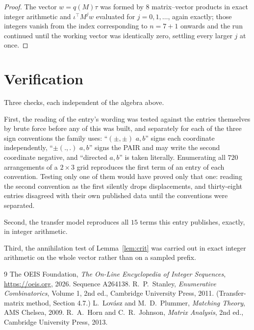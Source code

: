 \documentclass[11pt,a4paper]{article}
\theoremstyle{plain}
\theoremstyle{definition}
\begin{document}
\begin{proof}
The vector $w=q(M)\tau$ was formed by $8$ matrix--vector products in exact integer
arithmetic and $\iota^{\!\top}M^{j}w$ evaluated for $j=0,1,\dots$, again exactly; those
integers vanish from the index corresponding to $n=7+1$ onwards and the run continued
until the working vector was identically zero, settling every larger $j$ at once.
\end{proof}

\section{Verification}

Three checks, each independent of the algebra above.

First, the reading of the entry's wording was tested against the entries themselves by brute
force before any of this was built, and separately for each of the three sign conventions the
family uses: ``$(\pm,\pm)$ $a,b$'' signs each coordinate independently, ``$\pm(.,.)$ $a,b$''
signs the PAIR and may write the second coordinate negative, and ``directed $a,b$'' is taken
literally. Enumerating all $720$ arrangements of a $2\times3$ grid reproduces the first term
of an entry of each convention. Testing only one of them would have proved only that one:
reading the second convention as the first silently drops displacements, and thirty-eight
entries disagreed with their own published data until the conventions were separated.

Second, the transfer model reproduces all $15$ terms this entry publishes, exactly, in
integer arithmetic.

Third, the annihilation test of Lemma~\ref{lem:crit} was carried out in exact integer
arithmetic on the whole vector rather than on a sampled prefix.

\begin{thebibliography}{9}
 The OEIS Foundation, \emph{The On-Line Encyclopedia of Integer
Sequences}, \url{https://oeis.org}, 2026. Sequence A264138.
 R.~P.~Stanley, \emph{Enumerative Combinatorics}, Volume 1, 2nd ed.,
Cambridge University Press, 2011. (Transfer-matrix method, Section 4.7.)
 L.~Lov\'asz and M.~D.~Plummer, \emph{Matching Theory}, AMS Chelsea, 2009.
 R.~A.~Horn and C.~R.~Johnson, \emph{Matrix Analysis}, 2nd ed., Cambridge
University Press, 2013.
\end{thebibliography}
\end{document}
